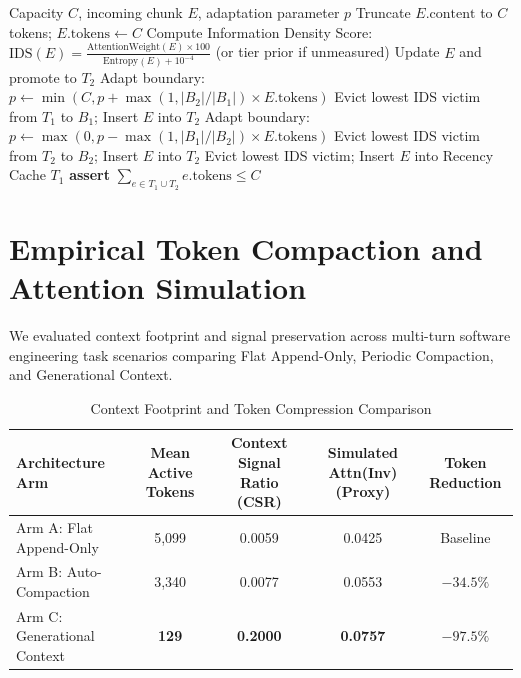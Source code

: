 \documentclass[11pt,a4paper]{article}
\begin{document}
\begin{algorithm}[H]
\caption{Attention-Weighted Eviction (AWE) with Hard Capacity Invariant}
\label{alg:awe}
\begin{algorithmic}[1]
\REQUIRE Capacity $C$, incoming chunk $E$, adaptation parameter $p$
    \STATE Truncate $E.\text{content}$ to $C$ tokens; $E.\text{tokens} \leftarrow C$
\ENDIF
\STATE Compute Information Density Score: $\text{IDS}(E) = \frac{\text{AttentionWeight}(E) \times 100}{\text{Entropy}(E) + 10^{-4}}$ (or tier prior if unmeasured)
    \STATE Update $E$ and promote to $T_2$
    \STATE Adapt boundary: $p \leftarrow \min(C, p + \max(1, |B_2|/|B_1|) \times E.\text{tokens})$
    \STATE Evict lowest IDS victim from $T_1$ to $B_1$; Insert $E$ into $T_2$
    \STATE Adapt boundary: $p \leftarrow \max(0, p - \max(1, |B_1|/|B_2|) \times E.\text{tokens})$
    \STATE Evict lowest IDS victim from $T_2$ to $B_2$; Insert $E$ into $T_2$
\ELSE
    \STATE Evict lowest IDS victim; Insert $E$ into Recency Cache $T_1$
\ENDIF
\STATE \textbf{assert} $\sum_{e \in T_1 \cup T_2} e.\text{tokens} \le C$
\end{algorithmic}
\end{algorithm}

\section{Empirical Token Compaction and Attention Simulation}
\label{sec:experiments}

We evaluated context footprint and signal preservation across multi-turn software engineering task scenarios comparing Flat Append-Only, Periodic Compaction, and Generational Context.

\begin{table}[ht]
\centering
\caption{Context Footprint and Token Compression Comparison}
\label{tab:compaction_results}
\begin{tabular}{lcccc}
\toprule
\textbf{Architecture Arm} & \textbf{Mean Active Tokens} & \textbf{Context Signal Ratio (CSR)} & \textbf{Simulated Attn(Inv) (Proxy)} & \textbf{Token Reduction} \\
\midrule
Arm A: Flat Append-Only & 5,099 & 0.0059 & 0.0425 & Baseline \\
Arm B: Auto-Compaction & 3,340 & 0.0077 & 0.0553 & $-34.5\%$ \\
Arm C: Generational Context & \textbf{129} & \textbf{0.2000} & \textbf{0.0757} & \textbf{$-97.5\%$} \\
\bottomrule
\end{tabular}
\end{table}
\end{document}
